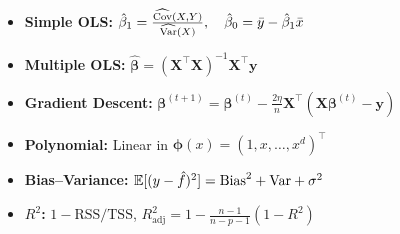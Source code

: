 \begin{keyformulas}[title=\textbf{Chapter 2 Summary}]
\begin{itemize}
    \item \textbf{Simple OLS:} $\hat{\beta}_1 = \frac{\widehat{\mathrm{Cov}}(X,Y)}{\widehat{\mathrm{Var}}(X)},\quad \hat{\beta}_0 = \bar{y} - \hat{\beta}_1\bar{x}$
    \item \textbf{Multiple OLS:} $\hat{\bm{\beta}} = (\bm{X}^\top\bm{X})^{-1}\bm{X}^\top\bm{y}$
    \item \textbf{Gradient Descent:} $\bm{\beta}^{(t+1)} = \bm{\beta}^{(t)} - \frac{2\eta}{n}\bm{X}^\top(\bm{X}\bm{\beta}^{(t)} - \bm{y})$
    \item \textbf{Polynomial:} Linear in $\bm{\phi}(x) = (1, x, \ldots, x^d)^\top$
    \item \textbf{Bias--Variance:} $\mathbb{E}[(y-\hat{f})^2] = \mathrm{Bias}^2 + \mathrm{Var} + \sigma^2$
    \item \textbf{$R^2$:} $1 - \text{RSS}/\text{TSS}$, \quad $R^2_{\text{adj}} = 1 - \frac{n-1}{n-p-1}(1-R^2)$
\end{itemize}
\end{keyformulas}
